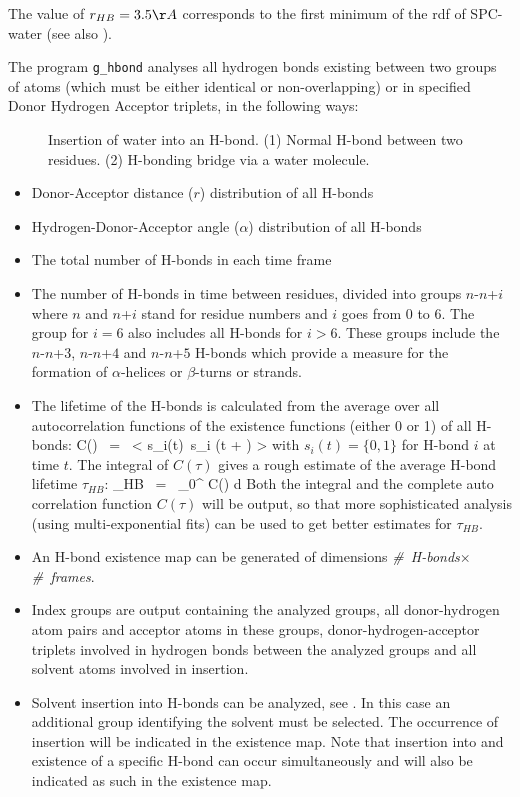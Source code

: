The value of $r_{HB} = 3.5 \AA$ corresponds to the first minimum of the rdf of 
SPC-water (see also ).

The program {\tt g\_hbond} analyses all hydrogen bonds existing
between two groups of atoms (which must be either identical or
non-overlapping) or in specified Donor Hydrogen Acceptor triplets, in
the following ways:

\begin{figure}
\centerline{
{}}
\caption[Insertion of water into an H-bond.]{Insertion of water into
an H-bond. (1) Normal H-bond between two residues. (2) H-bonding
bridge via a water molecule.}
\label{fig:insert}
\end{figure}

\begin{itemize}
\item
Donor-Acceptor distance ($r$) distribution of all H-bonds
\item
Hydrogen-Donor-Acceptor angle ($\alpha$) distribution of all H-bonds 
\item
The total number of H-bonds in each time frame
\item
\newcommand{\nn}[1]{$n$-$n$+$#1$}
The number of H-bonds in time between residues, divided into groups
\nn{i} where $n$ and $n$+$i$ stand for residue numbers and $i$ goes
from 0 to 6. The group for $i=6$ also includes all H-bonds for
$i>6$. These groups include the \nn{3}, \nn{4} and \nn{5} H-bonds
which provide a measure for the formation of $\alpha$-helices or
$\beta$-turns or strands.
\item
The lifetime of the H-bonds is calculated from the average over all
autocorrelation functions of the existence functions (either 0 or 1)
of all H-bonds:
\beq
C(\tau) ~=~ < s_i(t)~s_i (t + \tau) >
\label{eqn:hbcorr}
\eeq
with $s_i(t) = \{0,1\}$ for H-bond $i$ at time $t$. The integral of
$C(\tau)$ gives a rough estimate of the average H-bond lifetime
$\tau_{HB}$:
\beq
\tau_{HB} ~=~ \int_{0}^{\infty} C(\tau) d\tau
\label{eqn:hblife}
\eeq
Both the integral and the complete auto correlation function $C(\tau)$
will be output, so that more sophisticated analysis ({\eg}\@ using
multi-exponential fits) can be used to get better estimates for
$\tau_{HB}$.
\item
An H-bond existence map can be generated of dimensions {\em
\#~H-bonds}$\times${\em \#~frames}.
\item
Index groups are output containing the analyzed groups, all
donor-hydrogen atom pairs and acceptor atoms in these groups,
donor-hydrogen-acceptor triplets involved in hydrogen bonds between
the analyzed groups and all solvent atoms involved in insertion.
\item
Solvent insertion into H-bonds can be analyzed, see
. In this case an additional group identifying
the solvent must be selected. The occurrence of insertion will be
indicated in the existence map. Note that insertion into and existence
of a specific H-bond can occur simultaneously and will also be
indicated as such in the existence map.
\end{itemize}

